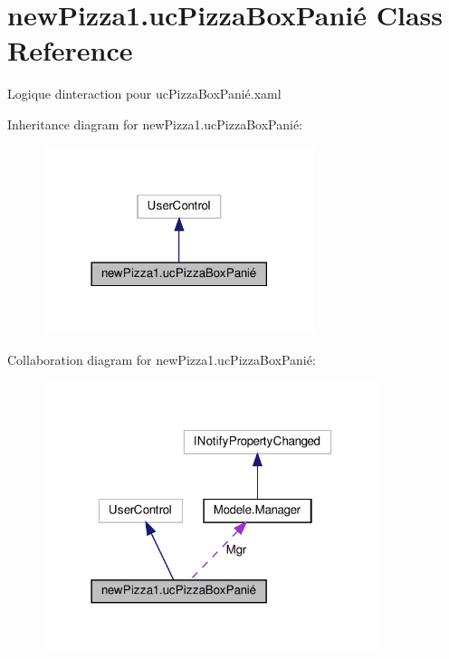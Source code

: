 \hypertarget{classnewPizza1_1_1ucPizzaBoxPani_xC3_xA9}{}\section{new\+Pizza1.\+uc\+Pizza\+Box\+Panié Class Reference}
\label{classnewPizza1_1_1ucPizzaBoxPani_xC3_xA9}


Logique d\textquotesingle{}interaction pour uc\+Pizza\+Box\+Panié.\+xaml  




Inheritance diagram for new\+Pizza1.\+uc\+Pizza\+Box\+Panié\+:
\nopagebreak
\begin{figure}[H]
\begin{center}
\leavevmode
\includegraphics[width=225pt]{classnewPizza1_1_1ucPizzaBoxPani_xC3_xA9__inherit__graph}
\end{center}
\end{figure}


Collaboration diagram for new\+Pizza1.\+uc\+Pizza\+Box\+Panié\+:
\nopagebreak
\begin{figure}[H]
\begin{center}
\leavevmode
\includegraphics[width=279pt]{classnewPizza1_1_1ucPizzaBoxPani_xC3_xA9__coll__graph}
\end{center}
\end{figure}
